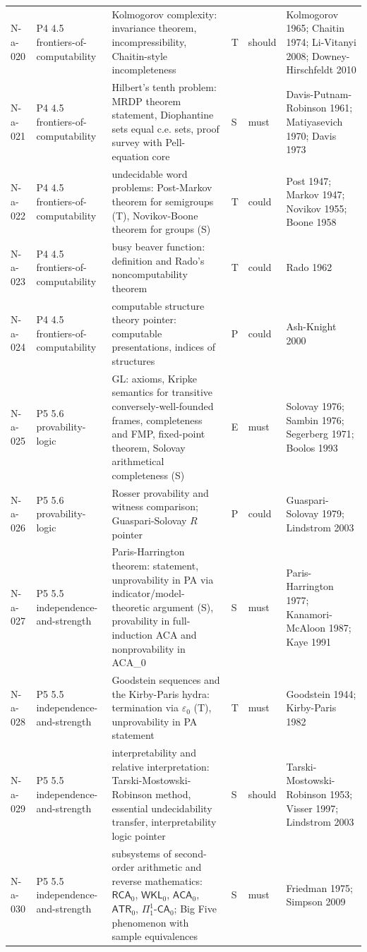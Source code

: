 \begin{longtable}{@{}p{0.52in}p{0.85in}p{2.5in}p{0.22in}p{0.42in}p{1.95in}@{}}
N-a-020 & P4 4.5 frontiers-of-computability & Kolmogorov complexity: invariance theorem, incompressibility, Chaitin-style incompleteness & T & should & Kolmogorov 1965; Chaitin 1974; Li-Vitanyi 2008; Downey-Hirschfeldt 2010 \\
N-a-021 & P4 4.5 frontiers-of-computability & Hilbert's tenth problem: MRDP theorem statement, Diophantine sets equal c.e. sets, proof survey with Pell-equation core & S & must & Davis-Putnam-Robinson 1961; Matiyasevich 1970; Davis 1973 \\
N-a-022 & P4 4.5 frontiers-of-computability & undecidable word problems: Post-Markov theorem for semigroups (T), Novikov-Boone theorem for groups (S) & T & could & Post 1947; Markov 1947; Novikov 1955; Boone 1958 \\
N-a-023 & P4 4.5 frontiers-of-computability & busy beaver function: definition and Rado's noncomputability theorem & T & could & Rado 1962 \\
N-a-024 & P4 4.5 frontiers-of-computability & computable structure theory pointer: computable presentations, indices of structures & P & could & Ash-Knight 2000 \\
N-a-025 & P5 5.6 provability-logic & GL: axioms, Kripke semantics for transitive conversely-well-founded frames, completeness and FMP, fixed-point theorem, Solovay arithmetical completeness (S) & E & must & Solovay 1976; Sambin 1976; Segerberg 1971; Boolos 1993 \\
N-a-026 & P5 5.6 provability-logic & Rosser provability and witness comparison; Guaspari-Solovay \(R\) pointer & P & could & Guaspari-Solovay 1979; Lindstrom 2003 \\
N-a-027 & P5 5.5 independence-and-strength & Paris-Harrington theorem: statement, unprovability in PA via indicator/model-theoretic argument (S), provability in full-induction ACA and nonprovability in ACA_0 & S & must & Paris-Harrington 1977; Kanamori-McAloon 1987; Kaye 1991 \\
N-a-028 & P5 5.5 independence-and-strength & Goodstein sequences and the Kirby-Paris hydra: termination via \(\varepsilon_0\) (T), unprovability in PA statement & T & must & Goodstein 1944; Kirby-Paris 1982 \\
N-a-029 & P5 5.5 independence-and-strength & interpretability and relative interpretation: Tarski-Mostowski-Robinson method, essential undecidability transfer, interpretability logic pointer & S & should & Tarski-Mostowski-Robinson 1953; Visser 1997; Lindstrom 2003 \\
N-a-030 & P5 5.5 independence-and-strength & subsystems of second-order arithmetic and reverse mathematics: \(\mathsf{RCA}_0\), \(\mathsf{WKL}_0\), \(\mathsf{ACA}_0\), \(\mathsf{ATR}_0\), \(\Pi^1_1\text{-}\mathsf{CA}_0\); Big Five phenomenon with sample equivalences & S & must & Friedman 1975; Simpson 2009 \\

\end{longtable}
